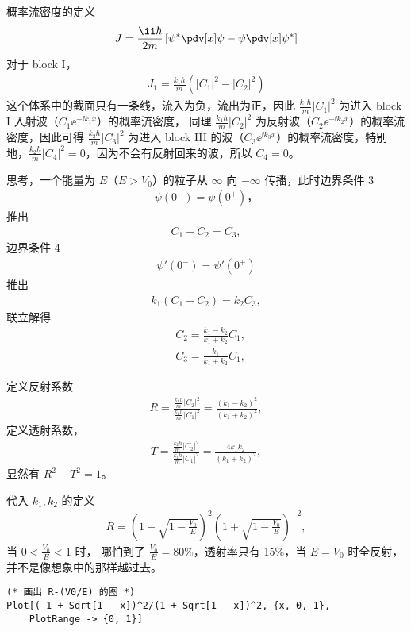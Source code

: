 概率流密度的定义
\begin{eqnarray}
    J = \frac{\ii\hbar}{2m} \left[
        \psi^* \pdv[x] \psi - \psi \pdv[x] \psi^*
    \right]
\end{eqnarray}
对于 block I，
\begin{eqnarray}
    J_1 = \frac{k_1 \hbar}{m} \left(
        |C_1|^2 - |C_2|^2
    \right)
\end{eqnarray}
这个体系中的截面只有一条线，流入为负，流出为正，因此
$\frac{k_1 \hbar}{m} |C_1|^2$ 为进入 block I 入射波（$C_1 \ee^{-\ii k_1 x}$）的概率流密度，
同理 $\frac{k_1 \hbar}{m} |C_2|^2$ 为反射波（$C_2 \ee^{-\ii k_2 x}$）的概率流密度，因此可得 $\frac{k_2 \hbar}{m} |C_3|^2$ 为进入 block III 的波（$C_3 \ee^{\ii k_3 x}$）的概率流密度，特别地，$\frac{k_2 \hbar}{m} |C_4|^2 = 0$，因为不会有反射回来的波，所以 $C_4 = 0$。

思考，一个能量为 $E$（$E>V_0$）的粒子从 $\infty$ 向 $-\infty$ 传播，此时边界条件 3
\begin{eqnarray}
    \psi(0^-) = \psi(0^+)，
\end{eqnarray}
推出
\begin{eqnarray}
    C_1 + C_2 = C_3,
\end{eqnarray}
边界条件 4
\begin{eqnarray}
    \psi'(0^-) = \psi'(0^+)
\end{eqnarray}
推出
\begin{eqnarray}
    k_1 (C_1 - C_2) = k_2 C_3,
\end{eqnarray}
联立解得
\begin{align}
    & C_2 = \frac{k_1 - k_2} {k_1 + k_2} C_1, \\
    & C_3 = \frac{k_1}{k_1 + k_2} C_1,
\end{align}

定义反射系数
\begin{eqnarray}
    R = \frac{ \displaystyle \frac{k_1 h}m |C_2|^2 } { \displaystyle \frac{k_1 h}m |C_1|^2 } = \frac{(k_1 - k_2)^2} {(k_1 + k_2)^2}, 
\end{eqnarray}
定义透射系数，
\begin{eqnarray}
    T = \frac{ \displaystyle \frac{k_2 h}m |C_2|^2 } { \displaystyle \frac{k_1 h}m |C_1|^2 } = \frac{4k_1k_2} {(k_1 + k_2)^2}, 
\end{eqnarray}
显然有 $R^2 + T^2 = 1$。

代入 $k_1, k_2$ 的定义
\begin{eqnarray}
    R = \left( 1 - \sqrt{1 - \frac{V_0}E}\right)^2 
    \left( 1 + \sqrt{1 - \frac{V_0}E}\right)^{-2},
\end{eqnarray}
当 $0 < \frac{V_0}{E} < 1$ 时，
哪怕到了 $\frac{V_0}E = 80\%$，透射率只有 15\%，当 $E = V_0$ 时全反射，并不是像想象中的那样越过去。
\begin{lstlisting}
(* 画出 R-(V0/E) 的图 *)
Plot[(-1 + Sqrt[1 - x])^2/(1 + Sqrt[1 - x])^2, {x, 0, 1}, 
    PlotRange -> {0, 1}]
\end{lstlisting}


